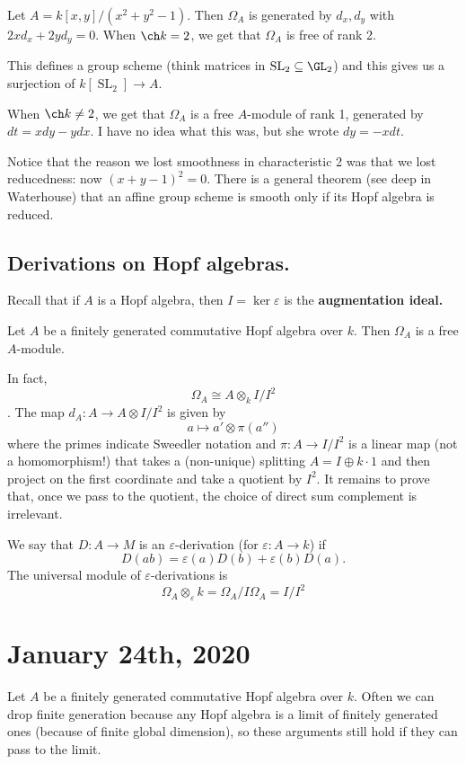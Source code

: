 \documentclass[12pt]{article}
\DeclareMathOperator{\SL}{SL}
\begin{document}
\begin{ex}
	Let $A=k[x,y]/(x^2+y^2-1)$. Then $\Omega_A$ is generated by $d_x,d_y$ with $2xd_x+2yd_y=0$. When $\ch k=2$,
	we get that $\Omega_A$ is free of rank 2.

	This defines a group scheme (think matrices in $\SL_2\subseteq\GL_2$) and this gives us a surjection of $k[\SL_2]\to A$.

	When $\ch k\ne 2$, we get that $\Omega_A$ is a free $A$-module of rank 1, generated by $dt=xdy-ydx$. I have no idea what this was,
	but she wrote $dy=-xdt.$
\end{ex}
\begin{rmk}
	Notice that the reason we lost smoothness in characteristic 2 was that we lost reducedness: now $(x+y-1)^2=0$. There 
	is a general theorem (see deep in Waterhouse) that an affine group scheme is smooth only if its Hopf algebra is reduced.
\end{rmk}
\subsection{Derivations on Hopf algebras.}
Recall that if $A$ is a Hopf algebra, then $I=\ker\varepsilon$ is the \textbf{augmentation ideal.}
\begin{thm}
	Let $A$ be a finitely generated commutative Hopf algebra over $k$. Then $\Omega_A$ is a free $A$-module.

	In fact, \[\Omega_A\cong A\otimes_k I/I^2\]. The map $d_A:A\to A\otimes I/I^2$ is given by 
	\[a\mapsto a'\otimes \pi(a'')\]
	where the primes indicate Sweedler notation and $\pi:A\to I/I^2$ is a linear map (not a homomorphism!) that takes a (non-unique) 
	splitting $A=I\oplus k\cdot 1$ and then project on the first coordinate and take a quotient by $I^2$. It remains to prove that, once we pass to the 
	quotient, the choice of direct sum complement is irrelevant.
\end{thm}

\begin{lem}
	We say that $D:A\to M$ is an $\varepsilon$-derivation (for $\varepsilon:A\to k$) if 
	\[D(ab)=\varepsilon(a)D(b)+\varepsilon(b)D(a).\]
	The universal module of $\varepsilon$-derivations is 
	\[\Omega_A\otimes_\varepsilon k=\Omega_A/I\Omega_A=I/I^2\]
\end{lem}

\section{January 24th, 2020}
Let $A$ be a finitely generated commutative Hopf algebra over $k$. Often we can drop finite generation 
because any Hopf algebra is a limit of finitely generated ones (because of finite global dimension), so 
these arguments still hold if they can pass to the limit.
\end{document}
